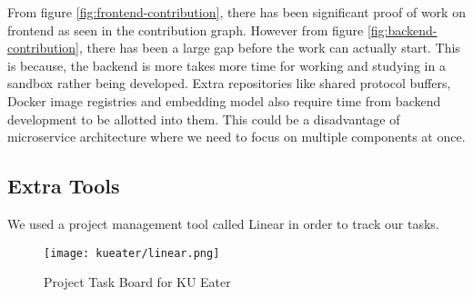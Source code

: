 From figure \ref{fig:frontend-contribution}, there has been significant proof of work on frontend as seen in the contribution graph.
However from figure \ref{fig:backend-contribution}, there has been a large gap before the work can actually start. This is because, the backend
is more takes more time for working and studying in a sandbox rather being developed. Extra repositories like shared protocol buffers, Docker image registries and
embedding model also require time from backend development to be allotted into them. This could be a disadvantage of microservice architecture where
we need to focus on multiple components at once.

\subsection{Extra Tools}
We used a project management tool called Linear in order to track our tasks.
\begin{figure}[H]
    \centering
    \texttt{[image: kueater/linear.png]}
    \caption{Project Task Board for KU Eater}
    \label{fig:linear}
\end{figure}